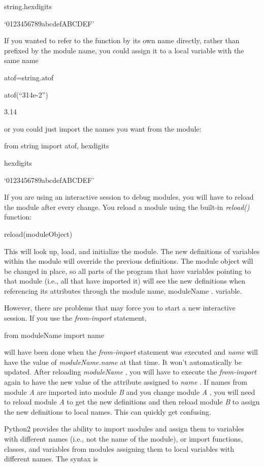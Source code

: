 string.hexdigits

`0123456789abcdefABCDEF'

If you wanted to refer to the
function by its own name directly, rather than prefixed by the module
name, you could assign it to a local variable with the same name


atof=string.atof


atof(``314e-2'')

3.14

or you could just import the names
you want from the module:


from string import atof, hexdigits


hexdigits

`0123456789abcdefABCDEF'

If you are using an interactive
session to debug modules, you will have to reload the module after every
change. You reload a module using the built-in \emph{reload()} function:

reload(moduleObject)

This will look up, load, and
initialize the module. The new definitions of variables within the
module will override the previous definitions. The module object will be
changed in place, so all parts of the program that have variables
pointing to that module (i.e., all that have imported it) will see the
new definitions when referencing its attributes through the module name,
moduleName . variable.

However, there are problems that
may force you to start a new interactive session. If you use the
\emph{from-import} statement,

from moduleName import name


will have been done when the \emph{from-import} statement was executed
and \emph{name} will have the value of \emph{moduleName.name} at that
time. It won't automatically be updated. After reloading
\emph{moduleName} , you will have to execute the \emph{from-import}
again to have the new value of the attribute assigned to \emph{name} .
If names from module \emph{A} are imported into module \emph{B} and you
change module \emph{A} , you will need to reload module \emph{A} to get
the new definitions and then reload module \emph{B} to assign the new
definitions to local names. This can quickly get confusing.

Python2 provides the ability to
import modules and assign them to variables with different names (i.e.,
not the name of the module), or import functions, classes, and variables
from modules assigning them to local variables with different names. The
syntax is


